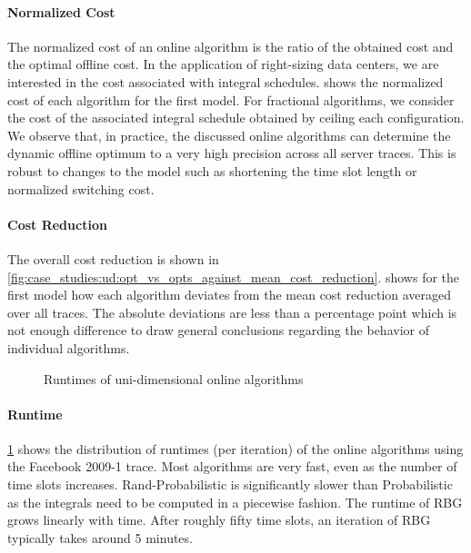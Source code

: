 \paragraph{Normalized Cost} The normalized cost of an online algorithm is the ratio of the obtained cost and the optimal offline cost. In the application of right-sizing data centers, we are interested in the cost associated with integral schedules.  shows the normalized cost of each algorithm for the first model. For fractional algorithms, we consider the cost of the associated integral schedule obtained by ceiling each configuration. We observe that, in practice, the discussed online algorithms can determine the dynamic offline optimum to a very high precision across all server traces. This is robust to changes to the model such as shortening the time slot length or normalized switching cost.

\paragraph{Cost Reduction} The overall cost reduction is shown in \cref{fig:case_studies:ud:opt_vs_opts_against_mean_cost_reduction}.  shows for the first model how each algorithm deviates from the mean cost reduction averaged over all traces. The absolute deviations are less than a percentage point which is not enough difference to draw general conclusions regarding the behavior of individual algorithms.

\begin{figure}
    \begin{subfigure}[b]{.5175\linewidth}
    \resizebox{\textwidth}{!}{}
    \end{subfigure}
    \begin{subfigure}[b]{.4825\linewidth}
    \resizebox{\textwidth}{!}{}
    \end{subfigure}
    \caption{Runtimes of uni-dimensional online algorithms}\label{fig:case_studies:ud:runtimes}
\end{figure}

\paragraph{Runtime} \cref{fig:case_studies:ud:runtimes} shows the distribution of runtimes (per iteration) of the online algorithms using the Facebook 2009-1 trace. Most algorithms are very fast, even as the number of time slots increases. Rand-Probabilistic is significantly slower than Probabilistic as the integrals need to be computed in a piecewise fashion. The runtime of RBG grows linearly with time. After roughly fifty time slots, an iteration of RBG typically takes around 5 minutes.

